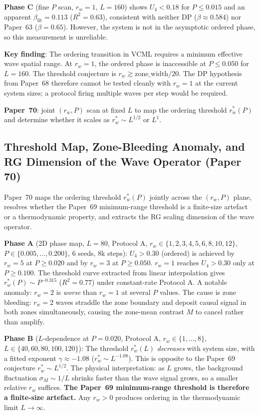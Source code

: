 \documentclass[11pt]{article}
\begin{document}
\textbf{Phase C} (fine $P$ scan, $r_w=1$, $L=160$) shows $U_4<0.18$ for $P\leq0.015$
and an apparent $\beta_\mathrm{fit}=0.113$ ($R^2=0.63$), consistent with neither
DP ($\beta\approx0.584$) nor Paper~63 ($\beta=0.65$).
However, the system is not in the asymptotic ordered phase, so this measurement
is unreliable.

\textbf{Key finding}: The ordering transition in VCML requires a minimum effective
wave spatial range.
At $r_w=1$, the ordered phase is inaccessible at $P\leq0.050$ for $L=160$.
The threshold conjecture is $r_w\gtrsim\text{zone\_width}/20$.
The DP hypothesis from Paper~68 therefore cannot be tested cleanly with $r_w=1$
at the current system sizes; a protocol firing multiple waves per step would be
required.

\textbf{Paper~70}: joint $(r_w, P)$ scan at fixed $L$ to map the ordering threshold
$r_w^*(P)$ and determine whether it scales as $r_w^*\sim L^{1/2}$ or $L^1$.

\subsection{Threshold Map, Zone-Bleeding Anomaly, and RG Dimension of the Wave Operator (Paper 70)}

Paper~70 maps the ordering threshold $r_w^*(P)$ jointly across the $(r_w, P)$ plane,
resolves whether the Paper~69 minimum-range threshold is a finite-size artefact or a
thermodynamic property, and extracts the RG scaling dimension of the wave operator.

\textbf{Phase A} (2D phase map, $L=80$, Protocol A, $r_w\in\{1,2,3,4,5,6,8,10,12\}$,
$P\in\{0.005,\ldots,0.200\}$, 6 seeds, 8k steps):
$U_4>0.30$ (ordered) is achieved by $r_w=5$ at $P\geq0.020$ and by $r_w=3$ at $P\geq0.050$.
$r_w=1$ reaches $U_4>0.30$ only at $P\geq0.100$.
The threshold curve extracted from linear interpolation gives $r_w^*(P)\sim P^{-0.315}$
($R^2=0.77$) under constant-rate Protocol A.
A notable anomaly: $r_w=2$ is \emph{worse} than $r_w=1$ at several $P$ values.
The cause is zone bleeding: $r_w=2$ waves straddle the zone boundary and deposit
causal signal in both zones simultaneously, causing the zone-mean contrast $M$ to
cancel rather than amplify.

\textbf{Phase B} ($L$-dependence at $P=0.020$, Protocol A, $r_w\in\{1,\ldots,8\}$,
$L\in\{40,60,80,100,120\}$):
The threshold $r_w^*(L)$ \emph{decreases} with system size, with a fitted exponent
$\gamma\approx-1.08$ ($r_w^*\sim L^{-1.08}$).
This is opposite to the Paper~69 conjecture $r_w^*\sim L^{1/2}$.
The physical interpretation: as $L$ grows, the background fluctuation $\sigma_M\sim 1/L$
shrinks faster than the wave signal grows, so a smaller relative $r_w$ suffices.
\textbf{The Paper~69 minimum-range threshold is therefore a finite-size artefact.}
Any $r_w>0$ produces ordering in the thermodynamic limit $L\to\infty$.
\end{document}

